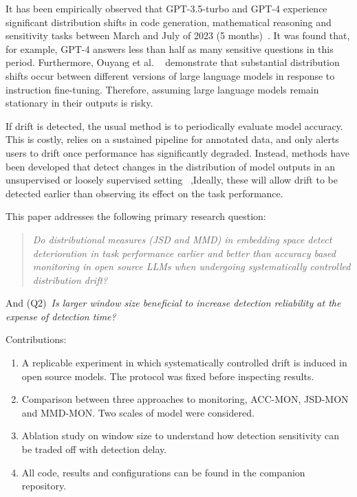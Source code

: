 \documentclass[12pt,a4paper]{article}
\begin{document}
It has been empirically observed that GPT-3.5-turbo and GPT-4 experience significant distribution shifts in code generation, mathematical reasoning and sensitivity tasks between March and July of 2023 (5 months)~\cite{Chen2023}. It was found that, for example, GPT-4 answers less than half as many sensitive questions in this period. Furthermore, Ouyang et al.  ~\cite{Ouyang2022} demonstrate that substantial distribution shifts occur between different versions of large language models in response to instruction fine-tuning. Therefore, assuming large language models remain stationary in their outputs is risky.

If drift is detected, the usual method is to periodically evaluate model accuracy. This is costly, relies on a sustained pipeline for annotated data, and only alerts users to drift once performance has significantly degraded. Instead, methods have been developed that detect changes in the distribution of model outputs in an unsupervised or loosely supervised setting~\cite{Gama2014,Lu2018} ,Ideally, these will allow drift to be detected earlier than observing its effect on the task performance. 


This paper addresses the following primary research question:
\begin{quote}
\textit{Do distributional measures (JSD and MMD) in embedding space detect deterioration in task performance earlier and better than accuracy based monitoring in open source LLMs when undergoing systematically controlled distribution drift?}
\end{quote}

And (Q2)~\textit{Is larger window size beneficial to increase detection reliability at the expense of detection time?}

\noindent Contributions:
\begin{enumerate}
  \item A replicable experiment in which systematically controlled drift is induced in open       source models. The protocol was fixed before inspecting results.
  \item Comparison between three approaches to monitoring, ACC-MON, JSD-MON and MMD-MON.          Two scales of model were considered.
  \item Ablation study on window size to understand how detection sensitivity can be traded       off with detection delay.
  \item All code, results and configurations can be found in the companion repository.
\end{enumerate}
\end{document}
